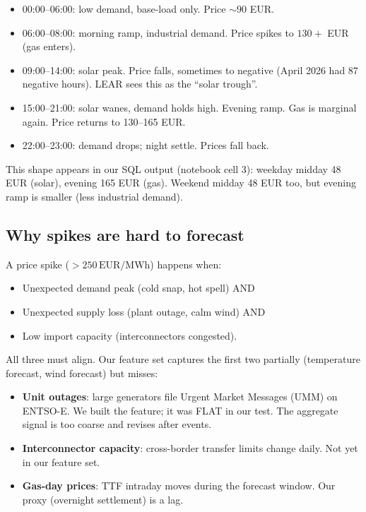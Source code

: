 \begin{itemize}
  \item 00:00--06:00: low demand, base-load only. Price $\sim90$ EUR.
  \item 06:00--08:00: morning ramp, industrial demand. Price spikes to
        $130+$ EUR (gas enters).
  \item 09:00--14:00: solar peak. Price falls, sometimes to negative
        (April 2026 had 87 negative hours). LEAR sees this as the
        ``solar trough''.
  \item 15:00--21:00: solar wanes, demand holds high. Evening ramp.
        Gas is marginal again. Price returns to 130--165 EUR.
  \item 22:00--23:00: demand drops; night settle. Prices fall back.
\end{itemize}

This shape appears in our SQL output (notebook cell 3): weekday midday
48 EUR (solar), evening 165 EUR (gas). Weekend midday 48 EUR too, but
evening ramp is smaller (less industrial demand).

\subsection{Why spikes are hard to forecast}

A price spike ($>250\,\mathrm{EUR/MWh}$) happens when:

\begin{itemize}
  \item Unexpected demand peak (cold snap, hot spell) AND
  \item Unexpected supply loss (plant outage, calm wind) AND
  \item Low import capacity (interconnectors congested).
\end{itemize}

All three must align. Our feature set captures the first two partially
(temperature forecast, wind forecast) but misses:
\begin{itemize}
  \item \textbf{Unit outages}: large generators file Urgent Market Messages
        (UMM) on ENTSO-E. We built the feature; it was FLAT in our test.
        The aggregate signal is too coarse and revises after events.
  \item \textbf{Interconnector capacity}: cross-border transfer limits
        change daily. Not yet in our feature set.
  \item \textbf{Gas-day prices}: TTF intraday moves during the forecast window.
        Our proxy (overnight settlement) is a lag.
\end{itemize}

